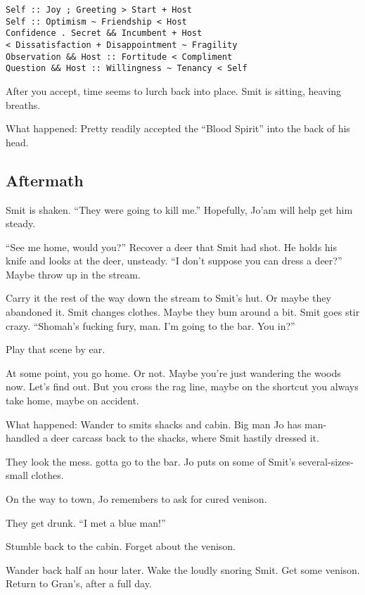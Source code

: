 \begin{multicols}{2}
\begin{verbatim}
Self :: Joy ; Greeting > Start + Host
Self :: Optimism ~ Friendship < Host
Confidence . Secret && Incumbent + Host
< Dissatisfaction + Disappointment ~ Fragility
Observation && Host :: Fortitude < Compliment
Question && Host :: Willingness ~ Tenancy < Self
\end{verbatim}

After you accept, time seems to lurch back into place.
Smit is sitting, heaving breaths.

  \begin{aloud}
  What happened:  Pretty readily accepted the ``Blood Spirit'' into the back of his head.
  \end{aloud}

  \subsection{Aftermath}
Smit is shaken.
``They were going to kill me.''
Hopefully, Jo'am will help get him steady.

``See me home, would you?''
Recover a deer that Smit had shot.
He holds his knife and looks at the deer, unsteady.
``I don't suppose you can dress a deer?''
Maybe throw up in the stream.

Carry it the rest of the way down the stream to Smit's hut.
Or maybe they abandoned it.
Smit changes clothes.
Maybe they bum around a bit.
Smit goes stir crazy.
``Shomah's fucking fury, man.
  I'm going to the bar.
  You in?''

Play that scene by ear.

At some point, you go home.
Or not.
Maybe you're just wandering the woods now.
Let's find out.
But you cross the rag line, maybe on the shortcut you always take home, maybe on accident.

  \begin{aloud}
    What happened:
    Wander to smits shacks and cabin.
    Big man Jo has man-handled a deer carcass back to the shacks, where Smit hastily dressed it.

    They look the mess.
    gotta go to the bar.
    Jo puts on some of Smit's several-sizes-small clothes.

    On the way to town, Jo remembers to ask for cured venison.

    They get drunk.
    ``I met a blue man!''

    Stumble back to the cabin.
    Forget about the venison.

    Wander back half an hour later.
    Wake the loudly snoring Smit.
    Get some venison.
    Return to Gran's, after a full day.
  \end{aloud}


\end{multicols}
